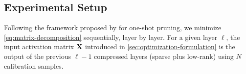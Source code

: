 


\subsection{Experimental Setup}
Following the framework proposed by \citet{frantar2023sparsegpt} for one-shot pruning, we minimize \cref{eq:matrix-decomposition} sequentially, layer by layer. For a given layer $\ell$, the input activation matrix $\mathbf{X}$ introduced in \cref{sec:optimization-formulation} is the output of the previous $\ell - 1$ compressed layers (sparse plus low-rank) using $N$ calibration samples. 

